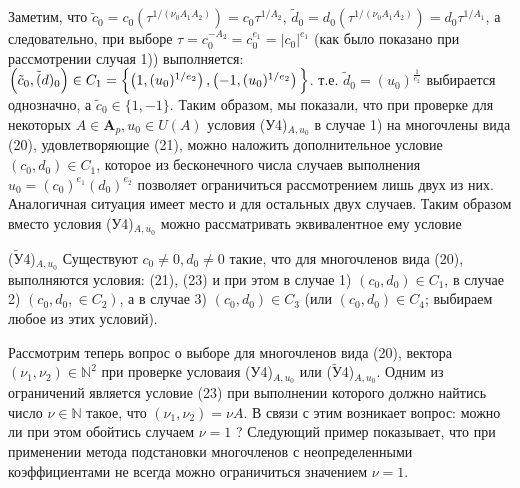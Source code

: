 \documentclass[11pt,reqno]{amsart}
\theoremstyle{plain}
\theoremstyle{definition}
\begin{document}
Заметим, что $\tilde{c}_0 = c_0 \left(\tau^{1/(\nu_0A_1A_2)}\right) = c_0\tau^{1/A_2} \text{, }\tilde{d}_0 = d_0 \left(\tau^{1/(\nu_0A_1A_2)}\right) = d_0\tau^{1/A_1}$, а следовательно, при выборе $\tau = c_0^{-A_2} = c^{e_1}_0 = |c_0|^{e_1}$ (как было показано при рассмотрении случая 1)) выполняется: $\left( \tilde{c}_0,\tilde(d)_0\right) \in C_1 = \Bigl\{\left(1, (u_0)^{1/e_2}\right),\left(-1, (u_0)^{1/e_2}\right)\Bigl\}$. т.е. $\tilde{d}_0 = (u_0)^{\frac{1}{e_2}}$ выбирается однозначно, а $\tilde{c}_0 \in \{1, -1\}$. Таким образом, мы показали, что при проверке для некоторых $A \in \mathbf{A}_p, u_0 \in U(A)$ условия (У4)$_{A,u_0}$ в случае 1) на многочлены вида (20), удовлетворяющие
(21), можно наложить дополнительное условие $(c_0, d_0) \in C_1$, которое из бесконечного числа
случаев выполнения $u_0 = (c_0)^{e_1}(d_0)^{e_2}$ позволяет ограничиться рассмотрением лишь двух из
них. Аналогичная ситуация имеет место и для остальных двух случаев. Таким образом
вместо условия (У4)$_{A,u_0}$ можно рассматривать эквивалентное ему условие

($\tilde{\text{У}}$4)$_{A,u_0}$ Существуют $c_0 \ne 0, d_0 \ne 0$ такие, что для многочленов вида (20), выполняются условия: (21), (23) и при этом в случае 1) $(c_0, d_0) \in C_1$, в случае 2) $(c_0, d_0, \in C_2)$, а в случае 3) $(c_0, d_0) \in C_3$ (или $(c_0, d_0) \in C_4$; выбираем любое из этих условий).

Рассмотрим теперь вопрос о выборе для многочленов вида (20), вектора $(\nu_1, \nu_2) \in \mathbb{N}^2$ при проверке условаия ($\text{У}$4)$_{A,u_0}$ или ($\tilde{\text{У}}$4)$_{A,u_0}$.  Одним из ограничений является условие (23) при выполнении которого должно найтись число $\nu \in \mathbb{N}$ такое, что $(\nu_1, \nu_2) = \nu A$. В связи с этим возникает вопрос: можно ли при этом обойтись случаем $\nu = 1$ ? Следующий пример показывает, что при применении метода подстановки многочленов с
неопределенными коэффициентами не всегда можно ограничиться значением $\nu = 1$.
\end{document}
